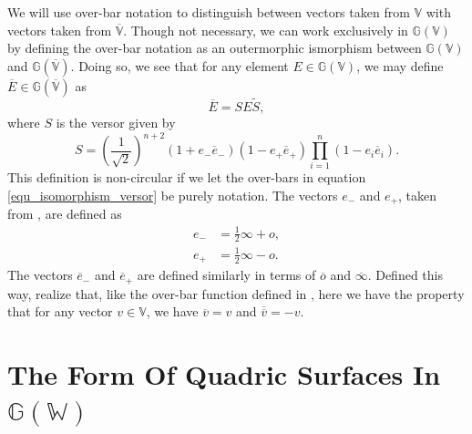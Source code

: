 \documentclass{birkjour}
\theoremstyle{definition}
\theoremstyle{remark}
\numberwithin{equation}{section}
\newcommand{\G}{\mathbb{G}}
\newcommand{\V}{\mathbb{V}}
\newcommand{\Vb}{\mathbb{\overline{V}}}
\newcommand{\W}{\mathbb{W}}
\newcommand{\nvao}{o}
\newcommand{\nvai}{\infty}
\newcommand{\nvaob}{\overline{o}}
\newcommand{\nvaib}{\overline{\infty}}
\newcommand{\eminus}{e_{-}}
\newcommand{\eplus}{e_{+}}
\newcommand{\eminusb}{\overline{e}_{-}}
\newcommand{\eplusb}{\overline{e}_{+}}
\begin{document}
We will use over-bar notation to distinguish between vectors taken from $\V$
with vectors taken from $\Vb$.  Though not necessary, we can work exclusively
in $\G(\V)$ by defining the over-bar notation as an outermorphic ismorphism between
$\G(\V)$ and $\G(\Vb)$.  Doing so, we see that for any element $E\in\G(\V)$,
we may define $\overline{E}\in\G(\Vb)$ as
\begin{equation}
\overline{E} = SE\tilde{S},
\end{equation}
where $S$ is the versor given by
\begin{equation}\label{equ_isomorphism_versor}
S = \left(\frac{1}{\sqrt{2}}\right)^{n+2}(1+\eminus\eminusb)(1-\eplus\eplusb)\prod_{i=1}^n(1-e_i\overline{e}_i).
\end{equation}
This definition is non-circular if we let the over-bars in equation \eqref{equ_isomorphism_versor}
be purely notation.  The vectors $\eminus$ and $\eplus$, taken from \cite{LiRockwood},
are defined as
\begin{align}
\eminus &= \frac{1}{2}\nvai + \nvao, \\
\eplus &= \frac{1}{2}\nvai - \nvao.
\end{align}
The vectors $\eminusb$ and $\eplusb$ are defined similarly in terms of $\nvaob$ and $\nvaib$.
Defined this way, realize that, like the over-bar function defined in \cite{Parkin12},
here we have the property that for any vector $v\in\V$, we have $\overline{v}=v$ and $\overline{\overline{v}}=-v$.

\section{The Form Of Quadric Surfaces In $\G(\W)$}
\end{document}
